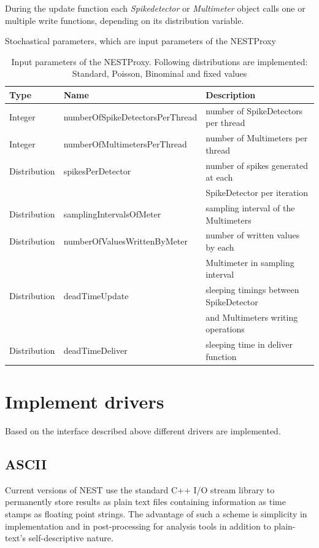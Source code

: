 \documentclass[]{YIC2015}
\begin{document}
During the update function each \emph{Spikedetector} or
\emph{Multimeter} object calls one or multiple write functions,
depending on its distribution variable.

\begin{table}[htdp]
\caption{Stochastical parameters, which are input parameters of the NESTProxy}
\centering
\begin{tabular}{lll}
\hline\hline
\textbf{Type} & \textbf{Name}                   & \textbf{Description} \\ \hline
Integer       & numberOfSpikeDetectorsPerThread & number of SpikeDetectors per thread  \\
Integer       & numberOfMultimetersPerThread    & number of Multimeters per thread  \\
Distribution  & spikesPerDetector               & number of spikes generated at each \\
	      &					& SpikeDetector per iteration  \\
Distribution  & samplingIntervalsOfMeter        & sampling interval of the Multimeters  \\
Distribution  & numberOfValuesWrittenByMeter    & number of written values by each \\
	      &					& Multimeter in sampling interval  \\
Distribution  & deadTimeUpdate                  & sleeping timings between SpikeDetector \\
	      &					& and Multimeters writing operations \\
Distribution  & deadTimeDeliver                 & sleeping time in deliver function  \\
\hline\hline
\end{tabular}
\label{tab:table-silva1}
\caption{Input parameters of the NESTProxy. Following distributions
are implemented: Standard, Poisson, Binominal and fixed values}
\end{table}

\section{Implement drivers}
Based on the interface described above different drivers are
implemented.

\subsection{ASCII}
\label{sec:ascii}
Current versions of NEST use the standard C++ I/O stream library
\cite{stream} to permanently store results as plain text files
containing information as time stamps as floating point strings. The
advantage of such a scheme is simplicity in implementation and in
post-processing for analysis tools in addition to plain-text's
self-descriptive nature.
\end{document}
